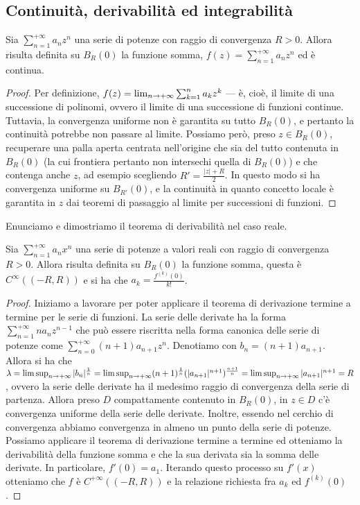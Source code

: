 \documentclass[Completo.tex]{subfiles}
\begin{document}
\subsection{Continuità, derivabilità ed integrabilità}
\begin{eTh}
	Sia $\sum_{n=1}^{+\infty} a_n z^n$ una serie di potenze con raggio di convergenza $R > 0$. Allora risulta definita su $B_R(0)$ la funzione somma, $f(z) = \sum_{n=1}^{+\infty} a_n z^n$ ed è continua.
\end{eTh}
\begin{proof}
	Per definizione, $f(z) = \lim_{n \rightarrow +\infty} \sum_{k=1}^{n} a_k z^k$ --- è, cioè, il limite di una successione di polinomi, ovvero il limite di una successione di funzioni continue. Tuttavia, la convergenza uniforme non è garantita su tutto $B_R(0)$, e pertanto la continuità potrebbe non passare al limite. Possiamo però, preso $z \in B_R(0)$, recuperare una palla aperta centrata nell'origine che sia del tutto contenuta in $B_R(0)$ (la cui frontiera pertanto non intersechi quella di $B_R(0)$) e che contenga anche $z$, ad esempio scegliendo $R' = \frac{\vert z \vert + R}{2}$. In questo modo si ha convergenza uniforme su $B_{R'}(0)$, e la continuità in quanto concetto locale è garantita in $z$ dai teoremi di passaggio al limite per successioni di funzioni.
\end{proof}
Enunciamo e dimostriamo il teorema di derivabilità nel caso reale.
\begin{eTh}
	Sia $\sum_{n=1}^{+\infty} a_n x^n$ una serie di potenze a valori reali con raggio di convergenza $R > 0$. Allora risulta definita su $B_R(0)$ la funzione somma, questa è $C^{\infty}((-R, R))$ e si ha che $a_k = \frac{f^{(k)}(0)}{k!}$.
\end{eTh}
\begin{proof}
	Iniziamo a lavorare per poter applicare il teorema di derivazione termine a termine per le serie di funzioni. La serie delle derivate ha la forma $\sum_{n=1}^{+\infty} n a_n z^{n-1}$ che può essere riscritta nella forma canonica delle serie di potenze come $\sum_{n=0}^{+\infty} (n+1) a_{n+1} z^n$. Denotiamo con $b_n = (n+1) a_{n+1}$. Allora si ha che $\lambda = \limsup_{n \rightarrow +\infty} \vert b_n \vert^{\frac{1}{n}} = \limsup_{n \rightarrow +\infty} (n+1)^{\frac{1}{n}} (\vert a_{n+1} \vert^{n+1})^{\frac{n+1}{n}} = \limsup_{n \rightarrow +\infty} \vert a_{n+1} \vert^{n+1} = R$, ovvero la serie delle derivate ha il medesimo raggio di convergenza della serie di partenza. Allora preso $D$ compattamente contenuto in $B_R(0)$, in $z \in D$ c'è convergenza uniforme della serie delle derivate. Inoltre, essendo nel cerchio di convergenza abbiamo convergenza in almeno un punto della serie di potenze. Possiamo applicare il teorema di derivazione termine a termine ed otteniamo la derivabilità della funzione somma e che la sua derivata sia la somma delle derivate. In particolare, $f'(0) = a_1$. Iterando questo processo su $f'(x)$ otteniamo che $f$ è $C^{+\infty}((-R, R))$ e la relazione richiesta fra $a_k$ ed $f^{(k)}(0)$. 
\end{proof}
\end{document}
